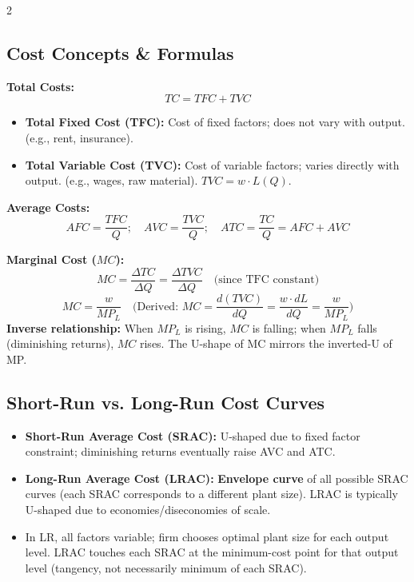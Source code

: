 \documentclass[10pt,a4paper]{article}
\begin{document}
\begin{multicols}{2}
\subsection*{Cost Concepts \& Formulas}
\textbf{Total Costs:}
\[
TC = TFC + TVC
\]
\begin{itemize}[nosep]
    \item \textbf{Total Fixed Cost (TFC):} Cost of fixed factors; does not vary with output. (e.g., rent, insurance).
    \item \textbf{Total Variable Cost (TVC):} Cost of variable factors; varies directly with output. (e.g., wages, raw material). $TVC = w \cdot L(Q)$.
\end{itemize}

\textbf{Average Costs:}
\[
AFC = \frac{TFC}{Q}; \quad AVC = \frac{TVC}{Q}; \quad ATC = \frac{TC}{Q} = AFC + AVC
\]

\textbf{Marginal Cost ($MC$):}
\[
MC = \frac{\Delta TC}{\Delta Q} = \frac{\Delta TVC}{\Delta Q} \quad \text{(since TFC constant)}
\]
\[
MC = \frac{w}{MP_L} \quad \text{(Derived: } MC = \frac{d(TVC)}{dQ} = \frac{w \cdot dL}{dQ} = \frac{w}{MP_L}\text{)}
\]
\textbf{Inverse relationship:} When $MP_L$ is rising, $MC$ is falling; when $MP_L$ falls (diminishing returns), $MC$ rises. The U-shape of MC mirrors the inverted-U of MP.

\subsection*{Short-Run vs. Long-Run Cost Curves}
\begin{itemize}[leftmargin=*,nosep]
    \item \textbf{Short-Run Average Cost (SRAC):} U-shaped due to fixed factor constraint; diminishing returns eventually raise AVC and ATC.
    \item \textbf{Long-Run Average Cost (LRAC):} \textbf{Envelope curve} of all possible SRAC curves (each SRAC corresponds to a different plant size). LRAC is typically U-shaped due to economies/diseconomies of scale.
    \item In LR, all factors variable; firm chooses optimal plant size for each output level. LRAC touches each SRAC at the minimum-cost point for that output level (tangency, not necessarily minimum of each SRAC).
\end{itemize}


\end{multicols}
\end{document}
